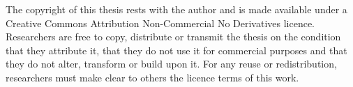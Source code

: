 
\cleardoublepage

{}

\begin{copyrightdecl}

The copyright of this thesis rests with the author and is made available under a Creative Commons Attribution Non-Commercial No Derivatives licence. 
Researchers are free to copy, distribute or transmit the thesis on the condition that they attribute it, that they do not use it for commercial purposes and that they do not alter, transform or build upon it. 
For any reuse or redistribution, researchers must make clear to others the licence terms of this work.

\end{copyrightdecl}
